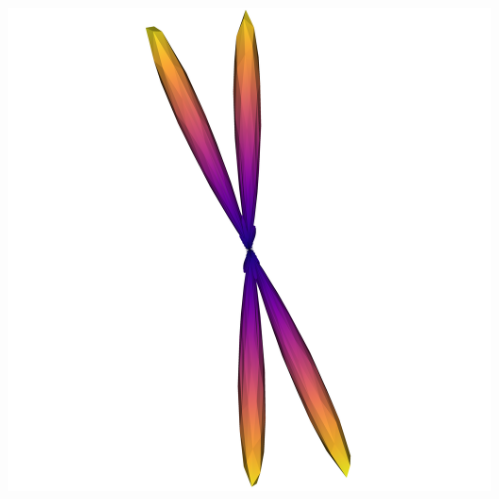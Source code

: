 \documentclass[presentation, 10pt]{beamer}
\begin{document}
\begin{frame}
\begin{columns}
\begin{column}{0.48\textwidth}
\begin{center}
      \end{center}
    \end{column}
    \begin{column}{0.48\textwidth}
      \begin{center}
        \includegraphics[width=\linewidth]{figs/phant_25_ST_ODF}
      \end{center}      
    \end{column}
  \end{columns}
\end{frame}
\end{document}

